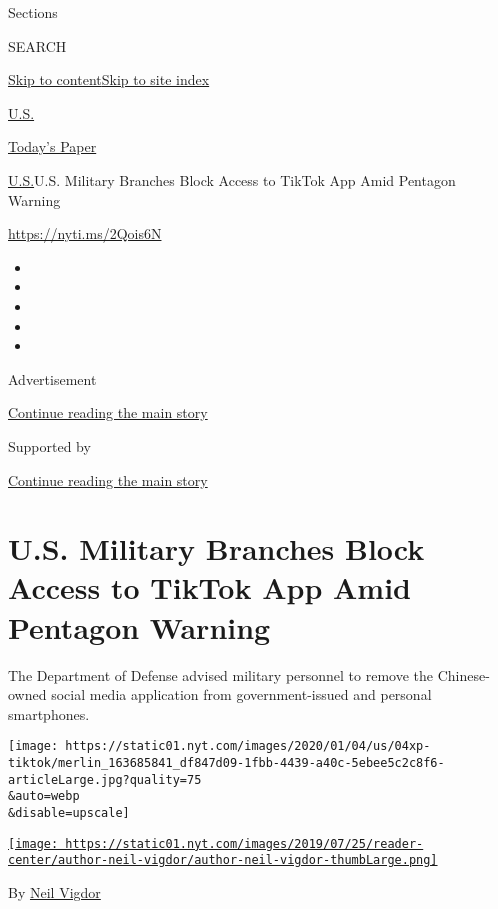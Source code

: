 Sections

SEARCH

\protect\hyperlink{site-content}{Skip to
content}\protect\hyperlink{site-index}{Skip to site index}

\href{https://www.nytimes.com/section/us}{U.S.}

\href{https://myaccount.nytimes.com/auth/login?response_type=cookie\&client_id=vi}{}

\href{https://www.nytimes.com/section/todayspaper}{Today's Paper}

\href{/section/us}{U.S.}\textbar{}U.S. Military Branches Block Access to
TikTok App Amid Pentagon Warning

\url{https://nyti.ms/2Qois6N}

\begin{itemize}
\item
\item
\item
\item
\item
\end{itemize}

Advertisement

\protect\hyperlink{after-top}{Continue reading the main story}

Supported by

\protect\hyperlink{after-sponsor}{Continue reading the main story}

\hypertarget{us-military-branches-block-access-to-tiktok-app-amid-pentagon-warning}{%
\section{U.S. Military Branches Block Access to TikTok App Amid Pentagon
Warning}\label{us-military-branches-block-access-to-tiktok-app-amid-pentagon-warning}}

The Department of Defense advised military personnel to remove the
Chinese-owned social media application from government-issued and
personal smartphones.

\texttt{[image: https://static01.nyt.com/images/2020/01/04/us/04xp-tiktok/merlin\_163685841\_df847d09-1fbb-4439-a40c-5ebee5c2c8f6-articleLarge.jpg?quality=75\\\&auto=webp\\\&disable=upscale]}

\href{https://www.nytimes.com/by/neil-vigdor}{\texttt{[image: https://static01.nyt.com/images/2019/07/25/reader-center/author-neil-vigdor/author-neil-vigdor-thumbLarge.png]}}

By \href{https://www.nytimes.com/by/neil-vigdor}{Neil Vigdor}

